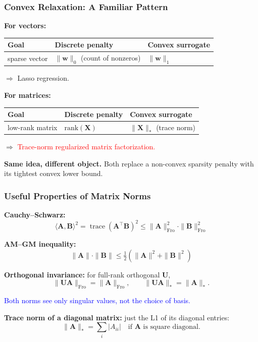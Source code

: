 \documentclass[notes,11pt, aspectratio=169]{beamer}
\DeclareMathOperator{\trace}{trace}
\newcommand{\vw}{\mathbf{w}}
\newcommand{\vA}{\mathbf{A}}
\newcommand{\vB}{\mathbf{B}}
\newcommand{\vU}{\mathbf{U}}
\newcommand{\vX}{\mathbf{X}}
\newcommand{\Frob}{\mathrm{Fro}}
\begin{document}
\begin{frame}
\frametitle{Convex Relaxation: A Familiar Pattern}

\textbf{For vectors:}
\begin{center}
\begin{tabular}{lll}
\toprule
\textbf{Goal} & \textbf{Discrete penalty} & \textbf{Convex surrogate} \\
\midrule
sparse vector & $\|\vw\|_0$ (count of nonzeros) & $\|\vw\|_1$ \\
\bottomrule
\end{tabular}
\end{center}

\vspace{6pt}
$\Rightarrow$ Lasso regression.

\vspace{12pt}
\textbf{For matrices:}
\begin{center}
\begin{tabular}{lll}
\toprule
\textbf{Goal} & \textbf{Discrete penalty} & \textbf{Convex surrogate} \\
\midrule
low-rank matrix & $\mathrm{rank}(\vX)$ & $\|\vX\|_*$ (trace norm) \\
\bottomrule
\end{tabular}
\end{center}

\vspace{6pt}
$\Rightarrow$ \textcolor{red}{Trace-norm regularized matrix factorization.}

\vspace{12pt}
\textbf{Same idea, different object.} Both replace a non-convex sparsity penalty with its tightest convex lower bound.
\end{frame}

\begin{frame}
\frametitle{Useful Properties of Matrix Norms}

\textbf{Cauchy--Schwarz:}
\[
    \langle \vA, \vB\rangle^2 = \trace(\vA^\top \vB)^2 \leq \|\vA\|_\Frob^2 \cdot \|\vB\|_\Frob^2
\]

\vspace{4pt}
\textbf{AM--GM inequality:}
\[
    \|\vA\| \cdot \|\vB\| \leq \tfrac{1}{2}(\|\vA\|^2 + \|\vB\|^2)
\]

\vspace{4pt}
\textbf{Orthogonal invariance:} for full-rank orthogonal $\vU$,
\[
    \|\vU \vA\|_\Frob = \|\vA\|_\Frob, \qquad \|\vU \vA\|_* = \|\vA\|_*.
\]

\vspace{6pt}
\textcolor{blue}{Both norms see only singular values, not the choice of basis.}

\vspace{6pt}
\textbf{Trace norm of a diagonal matrix:} just the L1 of its diagonal entries:
\[
    \|\vA\|_* = \sum_i |A_{ii}| \quad\text{if } \vA \text{ is square diagonal.}
\]
\end{frame}
\end{document}
